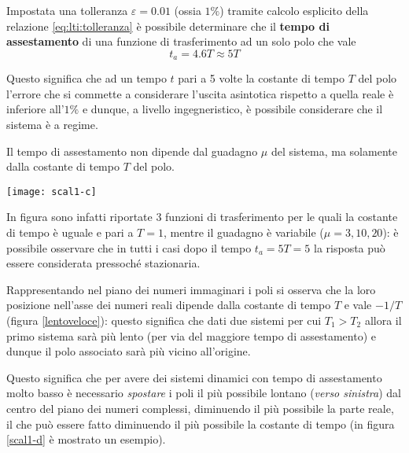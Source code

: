 			\begin{concetto}
				Impostata una tolleranza $\varepsilon = 0.01$ (ossia $1\%$) tramite calcolo esplicito della relazione \ref{eq:lti:tolleranza} è possibile determinare che il \textbf{tempo di assestamento} di una funzione di trasferimento ad un solo polo che vale
				\begin{equation} \label{eq:lti:tempo1polo}
					t_a = 4.6T \approx 5T
				\end{equation}
			\end{concetto}
			Questo significa che ad un tempo $t$ pari a 5 volte la costante di tempo $T$ del polo l'errore che si commette a considerare l'uscita asintotica rispetto a quella reale è inferiore all'$1\%$ e dunque, a livello ingegneristico, è possibile considerare che il sistema è a regime.
			\begin{osservazione}
				Il tempo di assestamento non dipende dal guadagno $\mu$ del sistema, ma solamente dalla costante di tempo $T$ del polo.
				\begin{center}
					\texttt{[image: scal1-c]}
				\end{center}
				In figura sono infatti riportate 3 funzioni di trasferimento per le quali la costante di tempo è uguale e pari a $T=1$, mentre il guadagno è variabile ($\mu = 3,10,20$): è possibile osservare che in tutti i casi dopo il tempo $t_a = 5T=5$ la risposta può essere considerata pressoché stazionaria.
			\end{osservazione}
			
			Rappresentando nel piano dei numeri immaginari i poli si osserva che la loro posizione nell'asse dei numeri reali dipende dalla costante di tempo $T$ e vale $-1/T$ (figura \ref{lentoveloce}): questo significa che dati due sistemi per cui $T_1 > T_2$ allora il primo sistema sarà più lento (per via del maggiore tempo di assestamento) e dunque il polo associato sarà più vicino all'origine. 
			
			
			Questo significa che per avere dei sistemi dinamici con tempo di assestamento molto basso è necessario \textit{spostare} i poli il più possibile lontano (\textit{verso sinistra}) dal centro del piano dei numeri complessi, diminuendo il più possibile la parte reale, il che può essere fatto diminuendo il più possibile la costante di tempo (in figura \ref{scal1-d} è mostrato un esempio).
		
